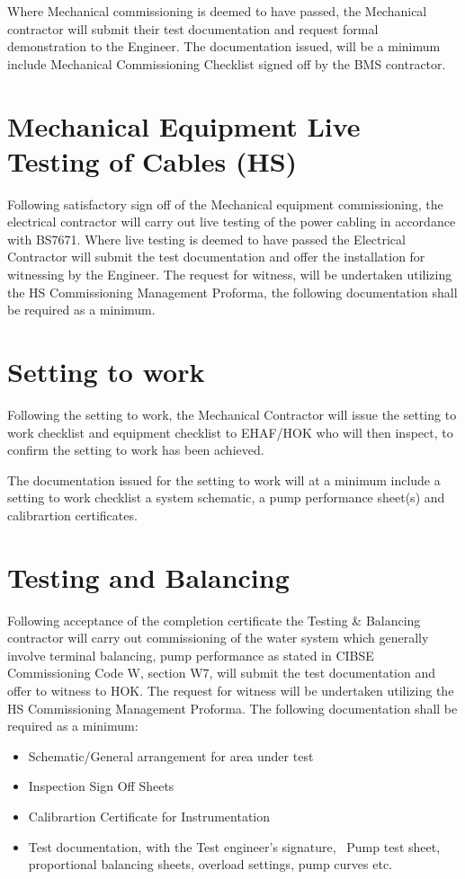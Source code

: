Where Mechanical commissioning is deemed to have passed, the Mechanical contractor will submit their test documentation and request formal demonstration to the Engineer. The documentation issued, will be a minimum include Mechanical Commissioning Checklist signed off by the BMS contractor.

\section{Mechanical Equipment Live Testing of Cables (HS)}

Following satisfactory sign off of the Mechanical equipment commissioning, the electrical contractor will carry out live testing of the power cabling in accordance with BS7671. Where live testing is deemed to have passed the Electrical Contractor will submit the test documentation and offer the installation for witnessing by the Engineer. The request for witness, will be undertaken utilizing the HS Commissioning Management Proforma, the following documentation shall be required as a minimum.

\section{Setting to work}

Following the setting to work, the Mechanical Contractor will issue the setting to work checklist and equipment checklist to EHAF/HOK who will then inspect, to confirm the setting to work has been achieved.

The documentation issued for the setting to work will at a minimum include a setting to work checklist a system schematic, a pump performance sheet(s) and calibrartion certificates.

\section{Testing and Balancing}

Following acceptance of the completion certificate the Testing \& Balancing contractor will carry out commissioning of the water system which generally involve terminal balancing, pump performance as stated in CIBSE Commissioning Code W, section W7, will submit the test documentation and offer to witness to HOK. The request for witness will be undertaken utilizing the HS Commissioning Management Proforma. The following documentation shall be required as a minimum:

\begin{itemize}
 \item Schematic/General arrangement for area under test
 \item Inspection Sign Off Sheets
 \item Calibrartion Certificate for Instrumentation
 \item Test documentation, with the Test engineer's signature, \ie\ Pump test sheet, proportional balancing sheets, overload settings, pump curves etc.
\end{itemize}

